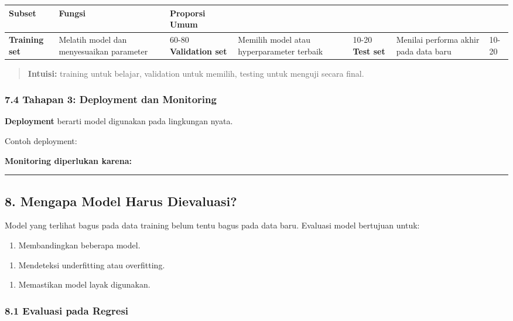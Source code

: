 \documentclass[12pt,a4paper]{article}
\begin{document}
\begin{tabular}{|l|l|l|}
\hline
Subset & Fungsi & Proporsi Umum \\
\hline
\textbf{Training set} & Melatih model dan menyesuaikan parameter & 60-80%
\hline
\textbf{Validation set} & Memilih model atau hyperparameter terbaik & 10-20%
\hline
\textbf{Test set} & Menilai performa akhir pada data baru & 10-20%
\hline
\end{tabular}


\begin{quote}
\textbf{Intuisi:} training untuk belajar, validation untuk memilih, testing untuk menguji secara final.\end{quote}


\subsubsection{7.4 Tahapan 3: Deployment dan Monitoring}

\textbf{Deployment} berarti model digunakan pada lingkungan nyata.


Contoh deployment:


\textbf{Monitoring diperlukan karena:}


\hrule


\subsection{8. Mengapa Model Harus Dievaluasi?}

Model yang terlihat bagus pada data training belum tentu bagus pada data baru. Evaluasi model bertujuan untuk:


\begin{enumerate}
\item Membandingkan beberapa model.
\end{enumerate}

\begin{enumerate}
\item Mendeteksi underfitting atau overfitting.
\end{enumerate}

\begin{enumerate}
\item Memastikan model layak digunakan.
\end{enumerate}


\subsubsection{8.1 Evaluasi pada Regresi}
\end{document}
